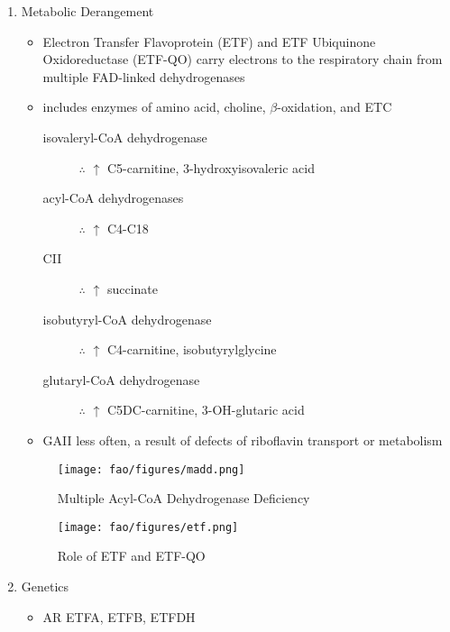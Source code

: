 \documentclass{scrartcl}
\begin{document}
\begin{enumerate}
\item Metabolic Derangement
\label{sec:orgb438574}
\begin{itemize}
\item Electron Transfer Flavoprotein (ETF) and ETF Ubiquinone
Oxidoreductase (ETF-QO) carry electrons to the respiratory chain from
multiple FAD-linked dehydrogenases
\item includes enzymes of amino acid, choline, \(\beta\)-oxidation, and ETC
\begin{description}
\item[{isovaleryl-CoA dehydrogenase}] \(\therefore\) \(\uparrow\) C5-carnitine, 3-hydroxyisovaleric acid
\item[{acyl-CoA dehydrogenases}] \(\therefore\) \(\uparrow\) C4-C18
\item[{CII}] \(\therefore\) \(\uparrow\) succinate
\item[{isobutyryl-CoA dehydrogenase}] \(\therefore\) \(\uparrow\) C4-carnitine, isobutyrylglycine
\item[{glutaryl-CoA dehydrogenase}] \(\therefore\) \(\uparrow\) C5DC-carnitine, 3-OH-glutaric acid
\end{description}

\item GAII less often, a result of defects of riboflavin transport or
metabolism
\end{itemize}

\begin{figure}[htbp]
\centering
\texttt{[image: fao/figures/madd.png]}
\caption{\label{fig:orgaa53a6d}Multiple Acyl-CoA Dehydrogenase Deficiency}
\end{figure}

\begin{figure}[htbp]
\centering
\texttt{[image: fao/figures/etf.png]}
\caption{\label{fig:org75ead5b}Role of ETF and ETF-QO}
\end{figure}

\item Genetics
\label{sec:org54a8f8c}
\begin{itemize}
\item AR ETFA, ETFB, ETFDH
\end{itemize}


\end{enumerate}
\end{document}

